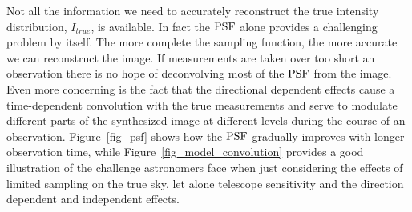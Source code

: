 Not all the information we need to accurately reconstruct the true intensity distribution, $I_{true}$, is available. In fact the $\textrm{PSF}$ alone provides a challenging
problem by itself. The more complete the sampling function, the more accurate we can reconstruct the image. If measurements are taken over too short an observation there is
no hope of deconvolving most of the $\textrm{PSF}$ from the image. Even more concerning is the fact that the directional dependent effects cause a time-dependent convolution with the
true measurements and serve to modulate different parts of the synthesized image at different levels during the course of an observation. Figure~\ref{fig_psf} shows how the 
$\textrm{PSF}$ gradually improves with longer observation time, while Figure~\ref{fig_model_convolution} provides a good illustration of the challenge astronomers face 
when just considering the effects of limited sampling on the true sky, let alone telescope sensitivity and the direction dependent and independent effects.
